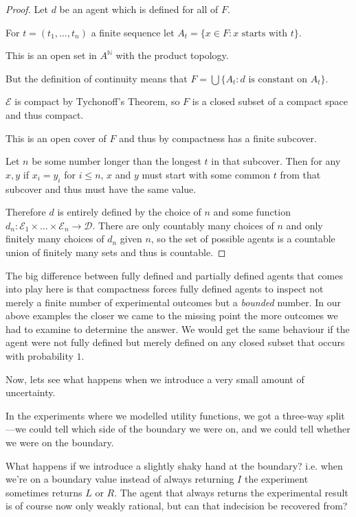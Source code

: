 \documentclass[a4paper]{book}
\begin{document}
\begin{proof}
Let $d$ be an agent which is defined for all of $F$.

For $t = (t_1, \ldots, t_n)$
a finite sequence let $A_t = \{ x \in F : x \text{ starts with } t\}$.

This is an open set in $A^{\mathbb{N}}$ with the product topology.

But the definition of continuity means that
$F = \bigcup \{A_t: d \text { is constant on } A_t \}$.

$\mathcal{E}$
is compact by Tychonoff's Theorem, so $F$
is a closed subset of a compact space and thus compact. 

This is an open cover of $F$
and thus by compactness has a finite subcover.

Let $n$ be some number longer than the longest $t$ in that subcover. Then for
any $x, y$ if $x_i = y_i$ for $i \leq n$, $x$ and $y$ must start with some
common $t$ from that subcover and thus must have the same value.

Therefore $d$ is entirely defined by the choice of $n$ and some function
$d_n: \mathcal{E}_1 \times \ldots \times \mathcal{E}_n \to \mathcal{D}$.
There are only countably many choices
of $n$ and only finitely many choices of $d_n$ given $n$, so the set of
possible agents is a countable union of finitely many sets and thus is
countable.
\end{proof}

The big difference between fully defined and partially defined agents that
comes into play here is that compactness forces fully defined agents to
inspect not merely a finite number of experimental outcomes but a \textit{bounded}
number. In our above examples the closer we came to the missing point the
more outcomes we had to examine to determine the answer. We would get
the same behaviour if the agent were not fully defined but merely
defined on any closed subset that occurs with probability $1$.

Now, lets see what happens when we introduce a very small amount of uncertainty.

In the experiments where we modelled utility functions, we got a three-way
split---we could tell which side of the boundary we were on, and we could
tell whether we were on the boundary.

What happens if we introduce a slightly shaky hand at the boundary? i.e.
when we're on a boundary value instead of always returning $I$ the experiment
sometimes returns $L$ or $R$. The agent that always returns the experimental
result is of course now only weakly rational, but can that indecision be
recovered from?
\end{document}
